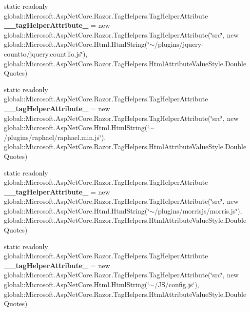 \begin{DoxyCompactItemize}
static readonly global\+::\+Microsoft.\+Asp\+Net\+Core.\+Razor.\+Tag\+Helpers.\+Tag\+Helper\+Attribute {\bfseries \+\_\+\+\_\+tag\+Helper\+Attribute\+\_} = new global\+::\+Microsoft.\+Asp\+Net\+Core.\+Razor.\+Tag\+Helpers.\+Tag\+Helper\+Attribute(\char`\"{}src\char`\"{}, new global\+::\+Microsoft.\+Asp\+Net\+Core.\+Html.\+Html\+String(\char`\"{}$\sim$/plugins/jquery-\/countto/jquery.\+count\+To.\+js\char`\"{}), global\+::\+Microsoft.\+Asp\+Net\+Core.\+Razor.\+Tag\+Helpers.\+Html\+Attribute\+Value\+Style.\+Double\+Quotes)
\item 
\mbox{\label{class_asp_net_core_1_1_views___shared____footer_adf259c2ba7a8377e4f52fbedc16dd032}} 
static readonly global\+::\+Microsoft.\+Asp\+Net\+Core.\+Razor.\+Tag\+Helpers.\+Tag\+Helper\+Attribute {\bfseries \+\_\+\+\_\+tag\+Helper\+Attribute\+\_} = new global\+::\+Microsoft.\+Asp\+Net\+Core.\+Razor.\+Tag\+Helpers.\+Tag\+Helper\+Attribute(\char`\"{}src\char`\"{}, new global\+::\+Microsoft.\+Asp\+Net\+Core.\+Html.\+Html\+String(\char`\"{}$\sim$/plugins/raphael/raphael.\+min.\+js\char`\"{}), global\+::\+Microsoft.\+Asp\+Net\+Core.\+Razor.\+Tag\+Helpers.\+Html\+Attribute\+Value\+Style.\+Double\+Quotes)
\item 
\mbox{\label{class_asp_net_core_1_1_views___shared____footer_aaba75ea90c197189f5021f64ce783547}} 
static readonly global\+::\+Microsoft.\+Asp\+Net\+Core.\+Razor.\+Tag\+Helpers.\+Tag\+Helper\+Attribute {\bfseries \+\_\+\+\_\+tag\+Helper\+Attribute\+\_} = new global\+::\+Microsoft.\+Asp\+Net\+Core.\+Razor.\+Tag\+Helpers.\+Tag\+Helper\+Attribute(\char`\"{}src\char`\"{}, new global\+::\+Microsoft.\+Asp\+Net\+Core.\+Html.\+Html\+String(\char`\"{}$\sim$/plugins/morrisjs/morris.\+js\char`\"{}), global\+::\+Microsoft.\+Asp\+Net\+Core.\+Razor.\+Tag\+Helpers.\+Html\+Attribute\+Value\+Style.\+Double\+Quotes)
\item 
\mbox{\label{class_asp_net_core_1_1_views___shared____footer_a11b1fa9fd2dc3ed94460c601ae7d7837}} 
static readonly global\+::\+Microsoft.\+Asp\+Net\+Core.\+Razor.\+Tag\+Helpers.\+Tag\+Helper\+Attribute {\bfseries \+\_\+\+\_\+tag\+Helper\+Attribute\+\_} = new global\+::\+Microsoft.\+Asp\+Net\+Core.\+Razor.\+Tag\+Helpers.\+Tag\+Helper\+Attribute(\char`\"{}src\char`\"{}, new global\+::\+Microsoft.\+Asp\+Net\+Core.\+Html.\+Html\+String(\char`\"{}$\sim$/JS/config.\+js\char`\"{}), global\+::\+Microsoft.\+Asp\+Net\+Core.\+Razor.\+Tag\+Helpers.\+Html\+Attribute\+Value\+Style.\+Double\+Quotes)

\end{DoxyCompactItemize}

